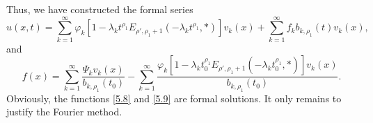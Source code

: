\documentclass[12pt, reqno]{amsart}
\theoremstyle{definition}
\theoremstyle{remark}
\numberwithin{equation}{section}
\begin{document}
Thus, we have constructed the formal series
\begin{equation}\label{5.8}
u(x,t)= \sum_{k=1}^{\infty}\varphi_k \left[ 1 - \lambda_k t^{\rho_1} E_{ \rho', \rho_1 + 1} \left( -\lambda_k t^{\rho_1}, * \right) \right]v_k(x)+\sum_{k=1}^{\infty}f_kb_{k,\rho_1}(t) v_k(x),
\end{equation}
 and
\begin{equation}\label{5.9}
f(x)=\sum_{k=1}^{\infty}\frac{\Psi_k v_k(x)}{b_{k,\rho_1}(t_0)}-\sum_{k=1}^{\infty}\frac{\varphi_k \left[ 1 - \lambda_k t_0^{\rho_1} E_{ \rho', \rho_1 + 1} \left( -\lambda_k t_0^{\rho_1}, * \right) \right]v_k(x)}{b_{k,\rho_1}(t_0)}.
\end{equation}
Obviously, the functions \eqref{5.8} and \eqref{5.9} are formal solutions. It only remains to justify the Fourier method.
\end{document}
